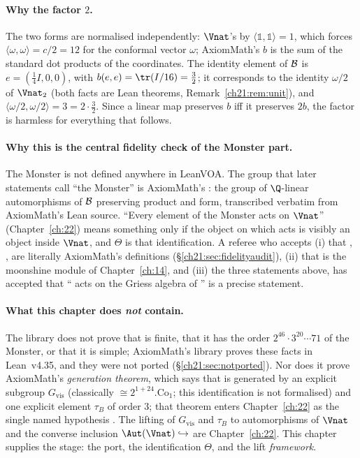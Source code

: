 \paragraph{Why the factor $2$.}  The two forms are normalised independently: $\Vnat$'s by
$\langle\mathbb1,\mathbb1\rangle=1$, which forces $\langle\omega,\omega\rangle=c/2=12$ for the conformal
vector $\omega$; AxiomMath's $b$ is the sum of the standard dot products of the coordinates.  The
identity element of $\mathcal{B}$ is $e=(\tfrac14I,0,0)$, with $b(e,e)=\tr(I/16)=\tfrac32$; it corresponds to
the identity $\omega/2$ of $\Vnat_2$ (both facts are Lean theorems, Remark~\ref{ch21:rem:unit}), and
$\langle\omega/2,\omega/2\rangle=3=2\cdot\tfrac32$.  Since a linear map preserves $b$ iff it preserves $2b$,
the factor is harmless for everything that follows.

\paragraph{Why this is the central fidelity check of the Monster part.}  The Monster is not defined
anywhere in LeanVOA.  The group that later statements call ``the Monster'' is AxiomMath's :
the group of $\Q$-linear automorphisms of $\mathcal{B}$ preserving product and form, transcribed verbatim
from AxiomMath's Lean source.  ``Every element of the Monster acts on $\Vnat$'' (Chapter~\ref{ch:22})
means something only if the object on which  acts is visibly an object inside $\Vnat$, and
$\Theta$ is that identification.  A referee who accepts (i) that , ,
 are literally AxiomMath's definitions (\S\ref{ch21:sec:fidelityaudit}), (ii) that
 is the moonshine module of Chapter~\ref{ch:14}, and (iii) the three statements above, has
accepted that `` acts on the Griess algebra of '' is a precise statement.

\paragraph{What this chapter does \emph{not} contain.}  The library does not prove that 
is finite, that it has the order $2^{46}\cdot3^{20}\cdots71$ of the Monster, or that it is simple;
AxiomMath's library proves these facts in Lean~v4.35, and they were not ported
(\S\ref{ch21:sec:notported}).  Nor does it prove AxiomMath's \emph{generation theorem}, which says that
 is generated by an explicit subgroup $G_{\mathrm{vis}}$ (classically
$\cong2^{1+24}.\mathrm{Co}_1$; this identification is not formalised) and one explicit element $\tau_B$
of order $3$; that theorem enters Chapter~\ref{ch:22} as the single named hypothesis .
The lifting of $G_{\mathrm{vis}}$ and $\tau_B$ to automorphisms of $\Vnat$ and the converse inclusion
$\Aut(\Vnat)\hookrightarrow$  are Chapter~\ref{ch:22}.  This chapter supplies the stage: the
port, the identification $\Theta$, and the lift \emph{framework}.


